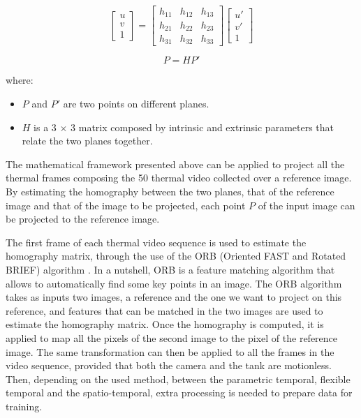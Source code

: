 \begin{equation}
    \begin{bmatrix} u\\ v\\ 1 \end{bmatrix} = 
        \begin{bmatrix}
        h_{11}& h_{12} & h_{13} \\ 
        h_{21}& h_{22} & h_{23} \\
        h_{31}& h_{32} & h_{33}
        \end{bmatrix}
        \begin{bmatrix} u'\\ v'\\ 1 \end{bmatrix}
\end{equation}

\begin{equation} \label{projection}
P=HP'
\end{equation}

where:

\begin{itemize}
    \item $P$ and $P'$ are two points on different planes.
    \item $H$ is a 3 $\times$ 3 matrix composed by intrinsic and extrinsic parameters that relate the two planes together.
\end{itemize}


The mathematical framework presented above can be applied to project all the thermal frames composing the 50 thermal video collected over a reference image. By estimating the homography between the two planes, that of the reference image and that of the image to be projected, each point $P$ of the input image can be projected to the reference image. 

The first frame of each thermal video sequence is used to estimate the homography matrix, through the use of the ORB (Oriented FAST and Rotated BRIEF) algorithm \citep{rublee2011orb}. In a nutshell, ORB is a feature matching algorithm that allows to automatically find some key points in an image. The ORB algorithm takes as inputs two images, a reference and the one we want to project on this reference, and features that can be matched in the two images are used to estimate the homography matrix. Once the homography is computed, it is applied to map all the pixels of the second image to the pixel of the reference image. The same transformation can then be applied to all the frames in the video sequence, provided that both the camera and the tank are motionless. 
%
Then, depending on the used method, between the parametric temporal, flexible temporal and the spatio-temporal, extra processing is needed to prepare data for training.

